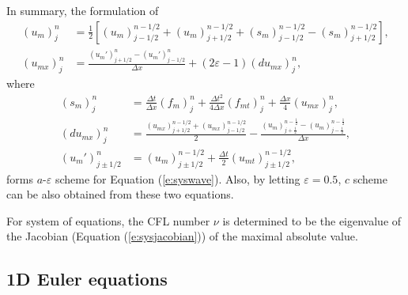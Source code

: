 \documentclass[letterpaper,12pt,dvips]{article}
\numberwithin{equation}{section}
\begin{document}
In summary, the formulation of 
\begin{align}
  (u_m)_j^n &= \frac{1}{2}\left[
      (u_m)_{j-1/2}^{n-1/2} + (u_m)_{j+1/2}^{n-1/2}
    + (s_m)_{j-1/2}^{n-1/2} - (s_m)_{j+1/2}^{n-1/2} 
    \right], \label{e:sysaeu} \\
  (u_{mx})_j^n &= \frac{(u_m')_{j+1/2}^n-(u_m')_{j-1/2}^n}{\Delta x}
    + (2\varepsilon-1)(du_{mx})_j^n, \label{e:sysaeux}
\end{align}
where
\begin{align*}
  (s_m)_j^n &= 
      \frac{\Delta t}  {\Delta x} (f_m)_j^n 
    + \frac{\Delta t^2}{4\Delta x}(f_{mt})_j^n
    + \frac{\Delta x}  {4}        (u_{mx})_j^n, \\
  (du_{mx})_j^n &=
      \frac{(u_{mx})_{j+1/2}^{n-1/2} 
                  + (u_{mx})_{j-1/2}^{n-1/2}}{2}
    - \frac{(u_m)_{j+\frac{1}{2}}^{n-\frac{1}{2}}
          - (u_m)_{j-\frac{1}{2}}^{n-\frac{1}{2}}}
           {\Delta x}, \\
  (u_m')_{j\pm1/2}^n &=
      (u_m)_{j\pm1/2}^{n-1/2} 
    + \frac{\Delta t}{2}(u_{mt})_{j\pm1/2}^{n-1/2}, 
\end{align*}
forms $a$-$\varepsilon$ scheme for Equation 
(\ref{e:syswave})\cite{b:chang95}.
Also, by letting $\varepsilon=0.5$, $c$ scheme can be also obtained from 
these two equations.

For system of equations, the CFL number $\nu$ is determined to be the 
eigenvalue of the Jacobian (Equation (\ref{e:sysjacobian})) of the 
maximal absolute value.

\subsection{1D Euler equations}
\end{document}

